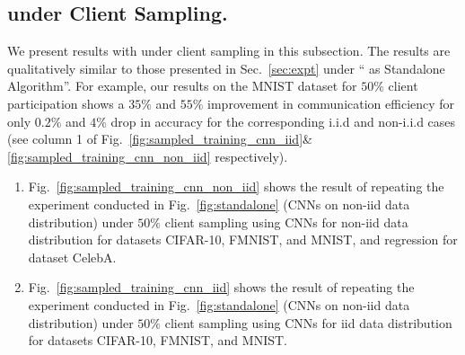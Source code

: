 \subsection{{\algName} under Client Sampling.}
\label{app:sampling_expt}

We present results with {\algName} under client sampling in this subsection. The results are qualitatively similar to those presented in Sec.~\ref{sec:expt} under ``{\algName} as Standalone Algorithm''. For example, our results on the MNIST dataset for $50\%$ client participation shows a $35\%$ and $55\%$ improvement in communication efficiency for only $0.2\%$ and $4\%$ drop in accuracy for the corresponding i.i.d and non-i.i.d cases (see column 1 of Fig.~\ref{fig:sampled_training_cnn_iid}\&\ref{fig:sampled_training_cnn_non_iid} respectively).
\begin{enumerate}[leftmargin=5mm]
    \item Fig.~\ref{fig:sampled_training_cnn_non_iid} shows the result of repeating the experiment conducted in Fig.~\ref{fig:standalone} (CNNs on non-iid data distribution) under $50\%$ client sampling using CNNs for non-iid data distribution for datasets CIFAR-10, FMNIST, and MNIST, and regression for dataset CelebA.
    \item Fig.~\ref{fig:sampled_training_cnn_iid} shows the result of repeating the experiment conducted in Fig.~\ref{fig:standalone} (CNNs on non-iid data distribution) under $50\%$ client sampling using CNNs for iid data distribution for datasets CIFAR-10, FMNIST, and MNIST.
\end{enumerate}




\newpage

